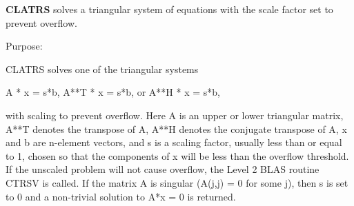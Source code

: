{\bfseries C\+L\+A\+T\+R\+S} solves a triangular system of equations with the scale factor set to prevent overflow. 

 \begin{DoxyParagraph}{Purpose\+: }
\begin{DoxyVerb} CLATRS solves one of the triangular systems

    A * x = s*b,  A**T * x = s*b,  or  A**H * x = s*b,

 with scaling to prevent overflow.  Here A is an upper or lower
 triangular matrix, A**T denotes the transpose of A, A**H denotes the
 conjugate transpose of A, x and b are n-element vectors, and s is a
 scaling factor, usually less than or equal to 1, chosen so that the
 components of x will be less than the overflow threshold.  If the
 unscaled problem will not cause overflow, the Level 2 BLAS routine
 CTRSV is called. If the matrix A is singular (A(j,j) = 0 for some j),
 then s is set to 0 and a non-trivial solution to A*x = 0 is returned.\end{DoxyVerb}
 
\end{DoxyParagraph}

